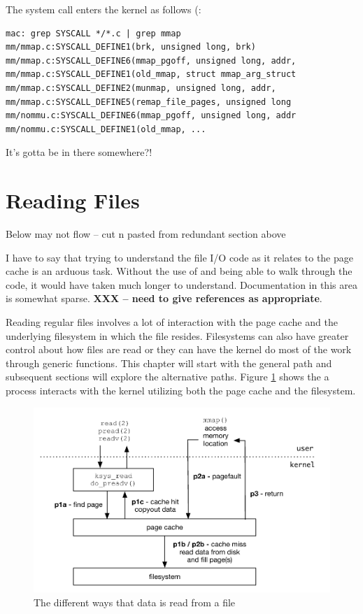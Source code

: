 \noindent
The  system call enters the kernel as follows (:

\begin{lstlisting}
mac: grep SYSCALL */*.c | grep mmap
mm/mmap.c:SYSCALL_DEFINE1(brk, unsigned long, brk)
mm/mmap.c:SYSCALL_DEFINE6(mmap_pgoff, unsigned long, addr, 
mm/mmap.c:SYSCALL_DEFINE1(old_mmap, struct mmap_arg_struct 
mm/mmap.c:SYSCALL_DEFINE2(munmap, unsigned long, addr, 
mm/mmap.c:SYSCALL_DEFINE5(remap_file_pages, unsigned long
mm/nommu.c:SYSCALL_DEFINE6(mmap_pgoff, unsigned long, addr
mm/nommu.c:SYSCALL_DEFINE1(old_mmap, ...
\end{lstlisting}

\noindent
It's gotta be in there somewhere?!


\section{Reading Files}

Below may not flow -- cut n pasted from redundant section above

I have to say that trying to understand the file I/O code as it relates to the page cache is an arduous task. Without the use of  and being able to walk through the code, it would have taken much longer to understand. Documentation in this area is somewhat sparse. \textbf{XXX -- need to give references as appropriate}.

Reading regular files involves a lot of interaction with the page cache and the underlying filesystem in which the file resides. Filesystems can also have greater control about how files are read or they can have the kernel do most of the work through generic functions. This chapter will start with the general path and subsequent sections will explore the alternative paths. Figure \ref{fig:vfs-read-file} shows the a process interacts with the kernel utilizing both the page cache and the filesystem.

\begin{figure}[h]
	\includegraphics[scale=0.6]{figures/vfs-file-read}
	\centering
	\caption{The different ways that data is read from a file}
	\label{fig:vfs-read-file}
\end{figure}

